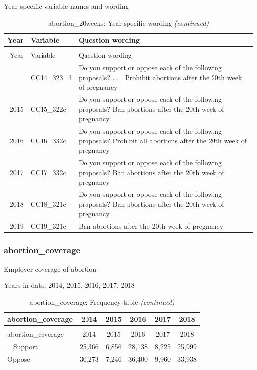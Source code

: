 \documentclass[12pt]{article}
\begin{document}
Year-specific variable names and wording

\begin{longtable}[t]{rl>{\raggedright\arraybackslash}p{10cm}}
\caption{\label{tab:unnamed-chunk-4}abortion\_20weeks: Year-specific wording}\\
\toprule
Year & Variable & Question wording\\
\midrule
\endfirsthead
\caption[]{abortion\_20weeks: Year-specific wording \textit{(continued)}}\\
\toprule
Year & Variable & Question wording\\
\midrule
\endhead
\
\endfoot
\bottomrule
\endlastfoot
2014 & CC14\_323\_3 & Do you support or oppose each of the following proposals? . . . Prohibit abortions after the 20th week of pregnancy\\
2015 & CC15\_322c & Do you support or oppose each of the following proposals? Ban abortions after the 20th week of pregnancy\\
2016 & CC16\_332c & Do you support or oppose each of the following proposals? Prohibit all abortions after the 20th week of pregnancy\\
2017 & CC17\_332c & Do you support or oppose each of the following proposals? Ban abortions after the 20th week of pregnancy\\
2018 & CC18\_321c & Do you support or oppose each of the following proposals? Ban abortions after the 20th week of pregnancy\\
2019 & CC19\_321c & Ban abortions after the 20th week of pregnancy\\*
\end{longtable}

\subsubsection{abortion\_coverage}\label{abortion_coverage}

Employer coverage of abortion

Years in data: 2014, 2015, 2016, 2017, 2018

\begin{longtable}[t]{lccccc}
\caption{\label{tab:unnamed-chunk-4}abortion\_coverage: Frequency table}\\
\toprule
abortion\_coverage & 2014 & 2015 & 2016 & 2017 & 2018\\
\midrule
\endfirsthead
\caption[]{abortion\_coverage: Frequency table \textit{(continued)}}\\
\toprule
abortion\_coverage & 2014 & 2015 & 2016 & 2017 & 2018\\
\midrule
\endhead
\
\endfoot
\bottomrule
\endlastfoot
Support & 25,366 & 6,856 & 28,138 & 8,225 & 25,999\\
Oppose & 30,273 & 7,246 & 36,400 & 9,960 & 33,938\\*
\end{longtable}
\end{document}
